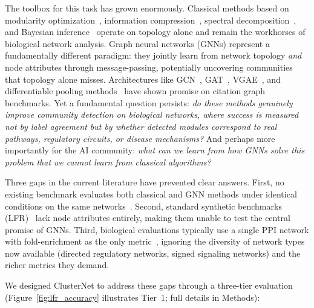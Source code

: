 \documentclass[11pt]{article}
\begin{document}
The toolbox for this task has grown enormously.
Classical methods based on modularity optimization~\citep{vincent_d__blondel_eead1c1a, traag_leiden_2019}, information compression~\citep{martin_rosvall_68b9da5e}, spectral decomposition~\citep{ulrike_von_luxburg_b9cd91aa}, and Bayesian inference~\citep{peixoto_sbm_2014} operate on topology alone and remain the workhorses of biological network analysis.
Graph neural networks (GNNs) represent a fundamentally different paradigm: they jointly learn from network topology \emph{and} node attributes through message-passing, potentially uncovering communities that topology alone misses.
Architectures like GCN~\citep{thomas_kipf_d7121869}, GAT~\citep{velickovic_gat_2018}, VGAE~\citep{thomas_kipf_6638cd97}, and differentiable pooling methods~\citep{tsitsulin_dmon_2023, bianchi_mincut_2020} have shown promise on citation graph benchmarks.
Yet a fundamental question persists: \emph{do these methods genuinely improve community detection on biological networks, where success is measured not by label agreement but by whether detected modules correspond to real pathways, regulatory circuits, or disease mechanisms?}
And perhaps more importantly for the AI community: \emph{what can we learn from how GNNs solve this problem that we cannot learn from classical algorithms?}

Three gaps in the current literature have prevented clear answers.
First, no existing benchmark evaluates both classical and GNN methods under identical conditions on the same networks~\citep{andrea_lancichinetti_37f463ca, zhao_yang_133f261c, xing_su_d49e541e}.
Second, standard synthetic benchmarks (LFR)~\citep{andrea_lancichinetti_125b2a5e} lack node attributes entirely, making them unable to test the central promise of GNNs.
Third, biological evaluations typically use a single PPI network with fold-enrichment as the only metric~\citep{choobdar_dream_2019}, ignoring the diversity of network types now available (directed regulatory networks, signed signaling networks) and the richer metrics they demand.

We designed ClusterNet to address these gaps through a three-tier evaluation (Figure~\ref{fig:lfr_accuracy} illustrates Tier~1; full details in Methods):
\end{document}

